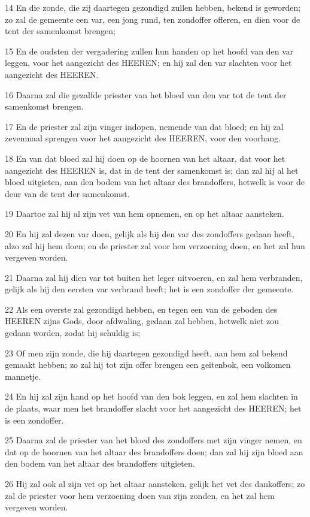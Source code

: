 \par 14 En die zonde, die zij daartegen gezondigd zullen hebben, bekend is geworden; zo zal de gemeente een var, een jong rund, ten zondoffer offeren, en dien voor de tent der samenkomst brengen;
\par 15 En de oudsten der vergadering zullen hun handen op het hoofd van den var leggen, voor het aangezicht des HEEREN; en hij zal den var slachten voor het aangezicht des HEEREN.
\par 16 Daarna zal die gezalfde priester van het bloed van den var tot de tent der samenkomst brengen.
\par 17 En de priester zal zijn vinger indopen, nemende van dat bloed; en hij zal zevenmaal sprengen voor het aangezicht des HEEREN, voor den voorhang.
\par 18 En van dat bloed zal hij doen op de hoornen van het altaar, dat voor het aangezicht des HEEREN is, dat in de tent der samenkomst is; dan zal hij al het bloed uitgieten, aan den bodem van het altaar des brandoffers, hetwelk is voor de deur van de tent der samenkomst.
\par 19 Daartoe zal hij al zijn vet van hem opnemen, en op het altaar aansteken.
\par 20 En hij zal dezen var doen, gelijk als hij den var des zondoffers gedaan heeft, alzo zal hij hem doen; en de priester zal voor hen verzoening doen, en het zal hun vergeven worden.
\par 21 Daarna zal hij dien var tot buiten het leger uitvoeren, en zal hem verbranden, gelijk als hij den eersten var verbrand heeft; het is een zondoffer der gemeente.
\par 22 Als een overste zal gezondigd hebben, en tegen een van de geboden des HEEREN zijns Gods, door afdwaling, gedaan zal hebben, hetwelk niet zou gedaan worden, zodat hij schuldig is;
\par 23 Of men zijn zonde, die hij daartegen gezondigd heeft, aan hem zal bekend gemaakt hebben; zo zal hij tot zijn offer brengen een geitenbok, een volkomen mannetje.
\par 24 En hij zal zijn hand op het hoofd van den bok leggen, en zal hem slachten in de plaats, waar men het brandoffer slacht voor het aangezicht des HEEREN; het is een zondoffer.
\par 25 Daarna zal de priester van het bloed des zondoffers met zijn vinger nemen, en dat op de hoornen van het altaar des brandoffers doen; dan zal hij zijn bloed aan den bodem van het altaar des brandoffers uitgieten.
\par 26 Hij zal ook al zijn vet op het altaar aansteken, gelijk het vet des dankoffers; zo zal de priester voor hem verzoening doen van zijn zonden, en het zal hem vergeven worden.
